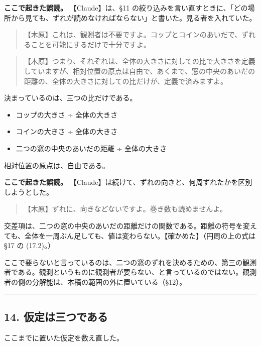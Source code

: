 \documentclass[
  a4paper,
]{ltjsarticle}
\providecommand{\tightlist}{%
  \setlength{\itemsep}{0pt}\setlength{\parskip}{0pt}}
\begin{document}
\textbf{ここで起きた誤読。} 【Claude】は、§11
の絞り込みを言い直すときに、「どの場所から見ても、ずれが読めなければならない」と書いた。見る者を入れていた。

\begin{quote}
【木原】これは、観測者は不要ですよ。コップとコインのあいだで、ずれることを可能にするだけで十分ですよ。
\end{quote}

\begin{quote}
【木原】つまり、それぞれは、全体の大きさに対しての比で大きさを定義していますが、相対位置の原点は自由で、あくまで、窓の中央のあいだの距離の、全体の大きさに対しての比だけが、定義で済みますよ。
\end{quote}

決まっているのは、三つの比だけである。

\begin{itemize}
\tightlist
\item
  コップの大きさ ÷ 全体の大きさ
\item
  コインの大きさ ÷ 全体の大きさ
\item
  二つの窓の中央のあいだの距離 ÷ 全体の大きさ
\end{itemize}

相対位置の原点は、自由である。

\textbf{ここで起きた誤読。}
【Claude】は続けて、ずれの向きと、何周ずれたかを区別しようとした。

\begin{quote}
【木原】ずれに、向きなどないですよ。巻き数も読めませんよ。
\end{quote}

交差項は、二つの窓の中央のあいだの距離だけの関数である。距離の符号を変えても、全体を一周ぶん足しても、値は変わらない。【確かめた】（円周の上の式は
§17 の (17.2)。）

ここで要らないと言っているのは、二つの窓のずれを決めるための、第三の観測者である。観測というものに観測者が要らない、と言っているのではない。観測者の側の分解能は、本稿の範囲の外に置いている（§12）。

\begin{center}\rule{0.5\linewidth}{0.5pt}\end{center}

\subsection{14.
仮定は三つである}\label{ux4eeeux5b9aux306fux4e09ux3064ux3067ux3042ux308b}

ここまでに置いた仮定を数え直した。
\end{document}
